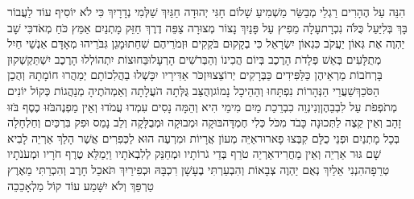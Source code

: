 \documentclass[../main/main.tex]{subfiles}
\begin{document}
\begin{multicols}{\ncols}
הִנֵּה עַל הֶהָרִים רַגְלֵי מְבַשֵּׂר מַשְׁמִיעַ שָׁלוֹם חָגִּי יְהוּדָה חַגַּיִךְ שַׁלְּמִי נְדָרָיִךְ כִּי לֹא יוֹסִיף עוֹד לַעֲבוֹר בָּךְ בְּלִיַּעַל כֻּלֹּה נִכְרָת\PreVerseSpace{}עָלָה מֵפִיץ עַל פָּנַיִךְ נָצוֹר מְצוּרָה צַפֵּה דֶרֶךְ חַזֵּק מָתְנַיִם אַמֵּץ כֹּחַ מְאֹד\PreVerseSpace{}כִּי שָׁב יַהְוֶה אֶת גְּאוֹן יַעֲקֹב כִּגְאוֹן יִשְׂרָאֵל כִּי בְקָקוּם בֹּקְקִים וּזְמֹרֵיהֶם שִׁחֵתוּ\PreVerseSpace{}מָגֵן גִּבֹּרֵיהוּ מְאָדָּם אַנְשֵׁי חַיִל מְתֻלָּעִים בְּאֵשׁ פְּלָדֹת הָרֶכֶב בְּיוֹם הֲכִינוֹ וְהַבְּרֹשִׁים הָרְעָלוּ\PreVerseSpace{}בַּחוּצוֹת יִתְהוֹלְלוּ הָרֶכֶב יִשְׁתַּקְשְׁקוּן בָּרְחֹבוֹת מַרְאֵיהֶן כַּלַּפִּידִים כַּבְּרָקִים יְרוֹצֵצוּ\PreVerseSpace{}יִזְכֹּר אַדִּירָיו יִכָּשְׁלוּ בַהֲלִכוֹתָם יְמַהֲרוּ חוֹמָתָהּ וְהֻכַן הַסֹּכֵךְ\PreVerseSpace{}שַׁעֲרֵי הַנְּהָרוֹת נִפְתָּחוּ וְהַהֵיכָל נָמוֹג\PreVerseSpace{}וְהֻצַּב גֻּלְּתָה הֹעֲלָתָה וְאַמְהֹתֶיהָ מְנַהֲגוֹת כְּקוֹל יוֹנִים מְתֹפְפֹת עַל לִבְבֵהֶן\PreVerseSpace{}וְנִינְוֵה כִבְרֵכַת מַיִם מִימֵי הִיא וְהֵמָּה נָסִים עִמְדוּ עֲמֹדוּ וְאֵין מַפְנֶה\PreVerseSpace{}בֹּזּוּ כֶסֶף בֹּזּוּ זָהָב וְאֵין קֵצֶה לַתְּכוּנָה כָּבֹד מִכֹּל כְּלִי חֶמְדָּה\PreVerseSpace{}בּוּקָה וּמְבוּקָה וּמְבֻלָּקָה וְלֵב נָמֵס וּפִק בִּרְכַּיִם וְחַלְחָלָה בְּכָל מָתְנַיִם וּפְנֵי כֻלָּם קִבְּצוּ פָארוּר\PreVerseSpace{}אַיֵּה מְעוֹן אֲרָיוֹת וּמִרְעֶה הוּא לַכְּפִרִים אֲשֶׁר הָלַךְ אַרְיֵה לָבִיא שָׁם גּוּר אַרְיֵה וְאֵין מַחֲרִיד\PreVerseSpace{}אַרְיֵה טֹרֵף בְּדֵי גֹרוֹתָיו וּמְחַנֵּק לְלִבְאֹתָיו וַיְמַלֵּא טֶרֶף חֹרָיו וּמְעֹנֹתָיו טְרֵפָה\PreVerseSpace{}הִנְנִי אֵלַיִךְ נְאֻם יַהְוֶה צְבָאוֹת וְהִבְעַרְתִּי בֶעָשָׁן רִכְבָּהּ וּכְפִירַיִךְ תֹּאכַל חָרֶב וְהִכְרַתִּי מֵאֶרֶץ טַרְפֵּךְ וְלֹא יִשָּׁמַע עוֹד קוֹל מַלְאָכֵכֵה\OpenSection{}\par

\end{multicols}
\end{document}
